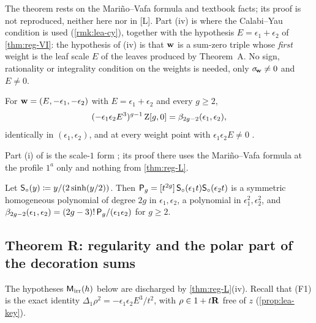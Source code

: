 The theorem rests on the Mari\~no--Vafa formula \cite[eq.~(1)--(3)]{LLZ03} and textbook facts; its proof is not reproduced, neither here nor in [L]. Part (iv) is where the Calabi--Yau condition is used (\cref{rmk:lea-cy}), together with the hypothesis $E=\epsilon_1+\epsilon_2$ of \cref{thm:reg-VI}: the hypothesis of (iv) is that $\mathbf{w}$ is a sum-zero triple whose \emph{first} weight is the leaf scale $E$ of the leaves produced by Theorem~A. No sign, rationality or integrality condition on the weights is needed, only $\sigma_{\!\mathbf{w}}\neq0$ and $E\neq0$.

\begin{thm}
\label{thm:reg-VI}
For $\mathbf{w}=(E,-\epsilon_1,-\epsilon_2)$ with $E=\epsilon_1+\epsilon_2$ and every $g\geq2$,
\begin{equation}
\label{eq:reg-VI}
(-\epsilon_1\epsilon_2E^3)^{g-1}\,\mathrm{Z}[g,0]=\beta_{2g-2}(\epsilon_1,\epsilon_2),
\end{equation}
identically in $(\epsilon_1,\epsilon_2)$, and at every weight point with $\epsilon_1\epsilon_2E\neq0$ \textup{\cite[Theorem~9.1]{LP2}}.
\end{thm}

Part (i) of  is the scale-$1$ form \cite[Theorem~9.3]{LP2}; its proof there uses the Mari\~no--Vafa formula at the profile $1^a$ only and nothing from \cref{thm:reg-L}.

\begin{lem}
\label{lem:reg-beta}
Let $\mathsf{S}_{\circ}(y)\coloneqq y/(2\sinh(y/2))$. Then $\mathsf{P}_{g}=[t^{2g}]\,\mathsf{S}_{\circ}(\epsilon_1t)\mathsf{S}_{\circ}(\epsilon_2t)$ is a symmetric homogeneous polynomial of degree $2g$ in $\epsilon_1,\epsilon_2$, a polynomial in $\epsilon_1^2,\epsilon_2^2$, and $\beta_{2g-2}(\epsilon_1,\epsilon_2)=(2g-3)!\,\mathsf{P}_{g}/(\epsilon_1\epsilon_2)$ for $g\geq2$.
\end{lem}

\subsection{Theorem R: regularity and the polar part of the decoration sums}
\label{sec:reg-thmR}

The hypotheses $\mathsf{M}_{\mathrm{irr}}(h)$ below are discharged by \cref{thm:reg-L}(iv). Recall that (F1) is the exact identity $\Delta_1\rho^2=-\epsilon_1\epsilon_2E^3/t^2$, with $\rho\in1+t\mathbf{R}$ free of $z$ (\cref{prop:lea-key}).

